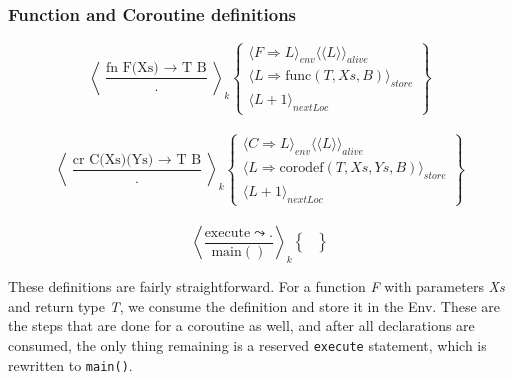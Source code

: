 \documentclass[review,twocolumn]{sigplanconf}
\begin{document}
\subsubsection*{Function and Coroutine definitions}

\begin{footnotesize}
  \[
    \left\langle
    \frac{ \text{fn F(Xs) $\rightarrow$ T B} }{ . }
    \right\rangle _k
    \left\{
    \begin{array}{l}
      \langle F \Rightarrow L\rangle_{env} \langle\langle L \rangle\rangle_{alive} \\
      \langle L \Rightarrow \text{func}(T, Xs, B)\rangle_{store}                   \\
      \langle L + 1 \rangle_{nextLoc}
    \end{array}
    \right\}
  \]
  \\
  \[
    \left\langle
    \frac{ \text{cr C(Xs)(Ys) $\rightarrow$ T B} }{ . }
    \right\rangle _k
    \left\{
    \begin{array}{l}
      \langle C \Rightarrow L\rangle_{env} \langle\langle L \rangle\rangle_{alive} \\
      \langle L \Rightarrow \text{corodef}(T, Xs, Ys, B)\rangle_{store}            \\
      \langle L + 1 \rangle_{nextLoc}
    \end{array}
    \right\}
  \]
  \\
  \[
    \left\langle
    \frac{ \text{execute} \leadsto . }{ \text{main}() }
    \right\rangle _k
    \left\{
    \begin{array}{l}
      \\
      \\
    \end{array}
    \right\}
  \]
\end{footnotesize}

These definitions are fairly straightforward. For a function \textit{F} with parameters \textit{Xs} and return type \textit{T}, we consume the definition and store it in the Env. These are the steps that are done for a coroutine as well, and after all declarations are consumed, the only thing remaining is a reserved \verb!execute! statement, which is rewritten to \verb!main()!.
\end{document}
